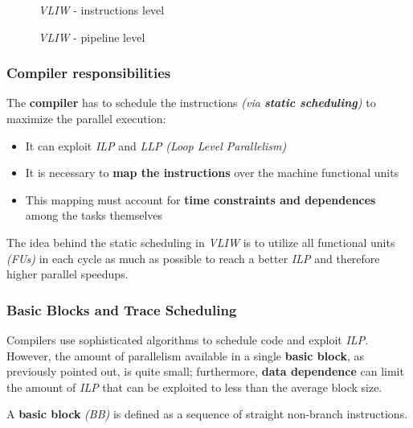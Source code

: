 \documentclass[english]{article}
\begin{document}
\begin{figure}[htbp]
  \bigskip
  \centering
  \caption{\textit{VLIW} - instructions level}
  \label{fig:vliw-instruction-level}
  \bigskip
\end{figure}

\begin{figure}[htbp]
  \bigskip
  \centering
  \caption{\textit{VLIW} - pipeline level}
  \label{fig:vliw-pipeline-level}
  \bigskip
\end{figure}

\subsubsection{Compiler responsibilities}

The \textbf{compiler} has to schedule the instructions \textit{(via \textbf{static scheduling})} to maximize the parallel execution:

\begin{itemize}
  \item It can exploit \textit{ILP} and \textit{LLP} \textit{(Loop Level Parallelism)}
  \item It is necessary to \textbf{map the instructions} over the machine functional units
  \item This mapping must account for \textbf{time constraints and dependences} among the tasks themselves
\end{itemize}

The idea behind the static scheduling in \textit{VLIW} is to utilize all functional units \textit{(FUs)} in each cycle as much as possible to reach a better \textit{ILP} and therefore higher parallel speedups.

\subsubsection{Basic Blocks and Trace Scheduling}
\label{sec:trace-scheduling}

Compilers use sophisticated algorithms to schedule code and exploit \textit{ILP}.
However, the amount of parallelism available in a single \textbf{basic block}, as previously pointed out, is quite small; furthermore, \textbf{data dependence} can limit the amount of \textit{ILP} that can be exploited to less than the average block size.

A \textbf{basic block} \textit{(BB)} is defined as a sequence of straight non-branch instructions.
\end{document}
